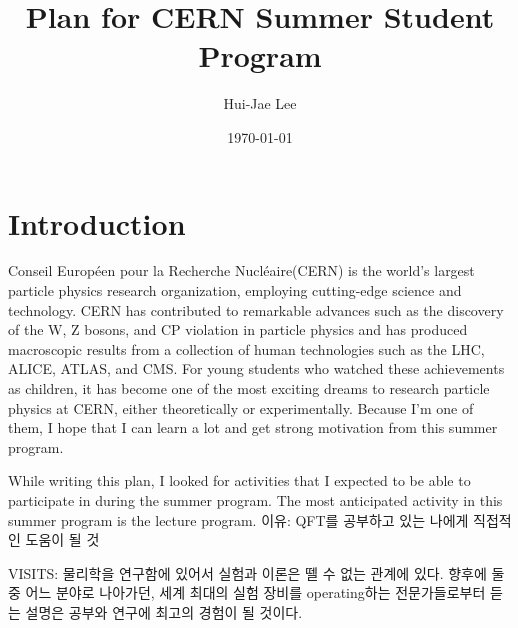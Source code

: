 \documentclass[aps,superscriptaddress,11pt]{revtex4-2}
\begin{document}
\title{Plan for CERN Summer Student Program}

\author{Hui-Jae Lee}


\date{\today}

 \maketitle
 
\section{Introduction}
Conseil Européen pour la Recherche Nucléaire(CERN) is the world's largest particle 
physics research organization, employing cutting-edge science and technology. 
CERN has contributed to remarkable advances such as the discovery of the W, Z bosons, 
and CP violation in particle physics and has produced macroscopic results from a 
collection of human technologies such as the LHC, ALICE, ATLAS, and CMS. For young 
students who watched these achievements as children, it has become one of the most 
exciting dreams to research particle physics at CERN, either theoretically or 
experimentally. Because I'm one of them, I hope that I can learn a lot and get 
strong motivation from this summer program.


While writing this plan, I looked for activities that 
I expected to be able to participate in during the summer program.
The most anticipated activity in this summer program is the 
lecture program. 이유: QFT를 공부하고 있는 나에게 직접적인 도움이 될 것

VISITS: 물리학을 연구함에 있어서 실험과 이론은 뗄 수 없는 관계에 있다. 
향후에 둘 중 어느 분야로 나아가던, 세계 최대의 실험 장비를 operating하는 
전문가들로부터 듣는 설명은 공부와 연구에 최고의 경험이 될 것이다.



\vfill
\end{document}
